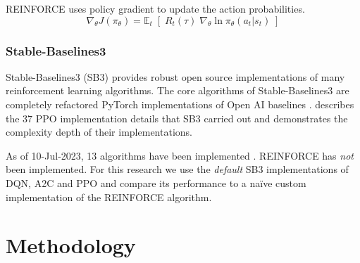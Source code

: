 \documentclass[a4paper, 12pt]{article}
\begin{document}
REINFORCE uses policy gradient to update the action probabilities.
\begin{equation}
	\nabla_ \theta J(\pi_\theta) = \mathbb{E}_t \; [ \; R_t(\tau) \; \nabla_\theta \ln \pi_\theta(a_t \vert s_t) \;]
	\label{eq:REINFORCE}
\end{equation}

\subsubsection*{Stable-Baselines3}
Stable-Baselines3 (SB3) \cite{SB3-paper} provides robust open source implementations of many reinforcement learning algorithms. The core algorithms of Stable-Baselines3 are completely refactored PyTorch implementations of Open AI baselines \citep{OpenAI-baselines}. \cite{SB3-PPO-implementation} describes the 37 PPO implementation details that SB3 carried out and demonstrates the complexity depth of their implementations.

As of 10-Jul-2023, 13 algorithms have been implemented \citep{SB3-algorithms}. REINFORCE has \textit{not} been implemented. For this research we use the \textit{default} SB3 implementations of DQN, A2C and PPO and compare its performance to a na\"ive custom implementation of the REINFORCE algorithm. %

\section{Methodology}\label{sec:Method}
\end{document}
